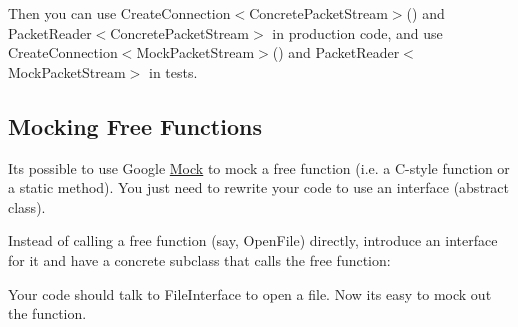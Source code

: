 \begin{DoxyCode}{0}
\DoxyCodeLine{}
\DoxyCodeLine{\};}
\end{DoxyCode}


Then you can use {\ttfamily Create\+Connection$<$Concrete\+Packet\+Stream$>$()} and {\ttfamily Packet\+Reader$<$Concrete\+Packet\+Stream$>$} in production code, and use {\ttfamily Create\+Connection$<$Mock\+Packet\+Stream$>$()} and {\ttfamily Packet\+Reader$<$Mock\+Packet\+Stream$>$} in tests.


\begin{DoxyCode}{0}
\end{DoxyCode}


\subsection*{Mocking Free Functions}

It\textquotesingle{}s possible to use Google \mbox{\hyperlink{classMock}{Mock}} to mock a free function (i.\+e. a C-\/style function or a static method). You just need to rewrite your code to use an interface (abstract class).

Instead of calling a free function (say, {\ttfamily Open\+File}) directly, introduce an interface for it and have a concrete subclass that calls the free function\+:


\begin{DoxyCode}{0}
\DoxyCodeLine{\};}
\DoxyCodeLine{}
\DoxyCodeLine{  \}}
\DoxyCodeLine{\};}
\end{DoxyCode}


Your code should talk to {\ttfamily File\+Interface} to open a file. Now it\textquotesingle{}s easy to mock out the function.

